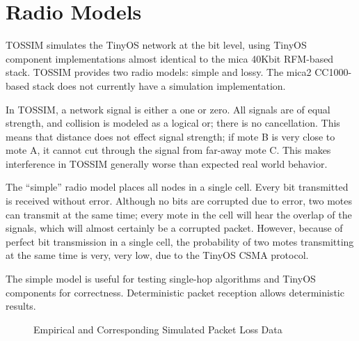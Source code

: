 \documentclass[10pt,fleqn]{article}
\def\sim{TOSSIM\xspace}
\begin{document}
\section{Radio Models}
\label{sec:radio}

\sim simulates the TinyOS network at the bit level, using TinyOS
component implementations almost identical to the mica 40Kbit
RFM-based stack. \sim provides two radio models: simple and lossy. The
mica2 CC1000-based stack does not currently have a simulation
implementation.

In \sim, a network signal is either a one or zero. All signals are of
equal strength, and collision is modeled as a logical or; there is no
cancellation. This means that distance does not effect signal
strength; if mote B is very close to mote A, it cannot cut through the
signal from far-away mote C. This makes interference in \sim generally
worse than expected real world behavior.

The ``simple'' radio model places all nodes in a single cell. Every
bit transmitted is received without error. Although no bits are
corrupted due to error, two motes can transmit at the same time; every
mote in the cell will hear the overlap of the signals, which will
almost certainly be a corrupted packet. However, because of perfect
bit transmission in a single cell, the probability of two motes
transmitting at the same time is very, very low, due to the TinyOS
CSMA protocol.

The simple model is useful for testing single-hop algorithms and
TinyOS components for correctness. Deterministic packet reception
allows deterministic results.

\begin{figure}
\centering
{}

\caption{Empirical and Corresponding Simulated Packet Loss Data}
\label{fig:loss_fig}
\end{figure}
\end{document}

